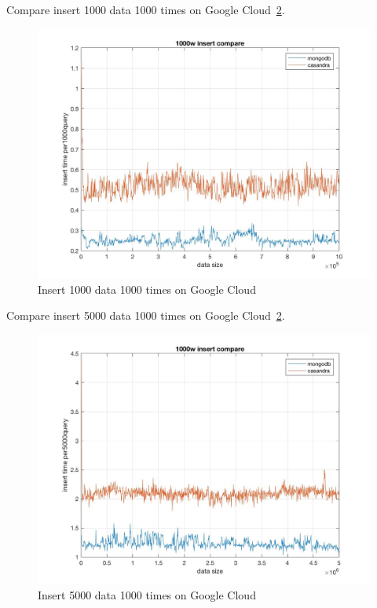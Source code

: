 Compare insert 1000 data 1000 times on Google Cloud~\ref{f:fly}.

\begin{figure}[!ht]
  \centering\includegraphics[width=\columnwidth]
  {images/insert_comp_1000_google.jpg}
  \caption{Insert 1000 data 1000 times on Google Cloud}\label{f:fly}
\end{figure}

Compare insert 5000 data 1000 times on Google Cloud~\ref{f:fly}.

\begin{figure}[!ht]
  \centering\includegraphics[width=\columnwidth]
  {images/insert_comp_5000_google.jpg}
  \caption{Insert 5000 data 1000 times on Google Cloud}\label{f:fly}
\end{figure}

